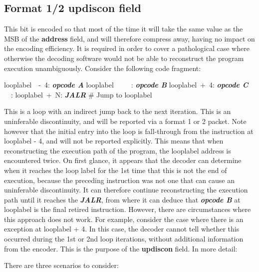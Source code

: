 \subsection{Format 1/2 \textbf{updiscon} field}

This bit is encoded so that most of the time it will take the same value as the MSB of the \textbf{address} field,
and will therefore compress away, having no impact on the encoding efficiency.  It is required in order to cover a
pathological case where otherwise the decoding software would not be able to reconstruct the program execution
unambiguously.  Consider the following code fragment:

looplabel~~-~4: \textbf{\textit{opcode A}} \newline
looplabel~~~~~: \textbf{\textit{opcode B}} \newline
looplabel~+~4: \textbf{\textit{opcode C}} \newline
~~: \newline
looplabel~+~N: \textbf{\textit{JALR}} \# Jump to looplabel\newline

This is a loop with an indirect jump back to the next iteration.  This is an uninferable discontinuity, and will be
reported via a format 1 or 2 packet.  Note however that the initial entry into the loop is fall-through from the
instruction at looplabel - 4, and will not be reported explicitly.  This means that when reconstructing the execution 
path of the program, the looplabel address is encountered twice.  On first glance, it appears that the decoder can determine
when it reaches the loop label for the 1st time that this is not the end of execution, because the preceding
instruction was not one that can cause an uninferable discontinuity.  It can therefore continue reconstructing the 
execution path until it reaches the \textbf{\textit{JALR}}, from where it can deduce that \textbf{\textit{opcode B}} at
looplabel is the final retired instruction.  However, there are circumstances where this approach 
does not work.  For example, consider the case where there is an exception at looplabel + 4.  In this case, the decoder
cannot tell whether this occurred during the 1st or 2nd loop iterations, without additional information from the 
encoder.  This is the purpose of the \textbf{updiscon} field.  In more detail:

There are three scenarios to consider:

